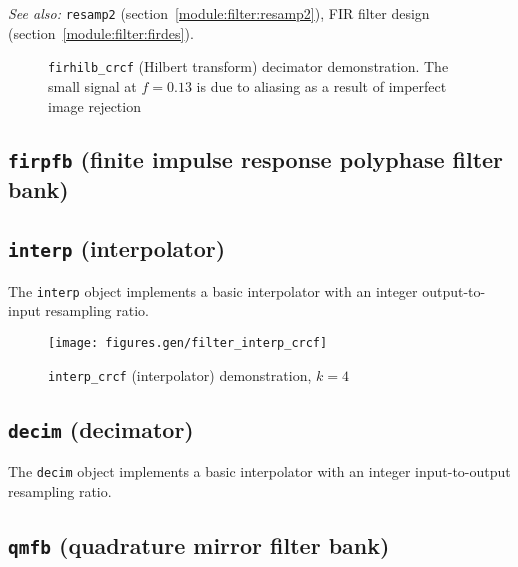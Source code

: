 {\it See also:} {\tt resamp2} (section~\ref{module:filter:resamp2}),
FIR filter design (section~\ref{module:filter:firdes}).



\begin{figure}
\centering
{}
\caption{{\tt firhilb\_crcf} (Hilbert transform) decimator demonstration. The
small signal at $f=0.13$ is due to aliasing as a result of imperfect image
rejection}
\label{fig:module:filter:firhilb_crcf}
\end{figure}

\subsection{{\tt firpfb} (finite impulse response polyphase filter bank)}

\subsection{{\tt interp} (interpolator)}
The {\tt interp} object implements a basic interpolator with an integer
output-to-input resampling ratio.



\begin{figure}
\centering
  \texttt{[image: figures.gen/filter\_interp\_crcf]}
\caption{{\tt interp\_crcf} (interpolator) demonstration, $k=4$}
\label{fig:module:filter:interp_crcf}
\end{figure}


\subsection{{\tt decim} (decimator)}
The {\tt decim} object implements a basic interpolator with an integer
input-to-output resampling ratio.

\subsection{{\tt qmfb} (quadrature mirror filter bank)}

